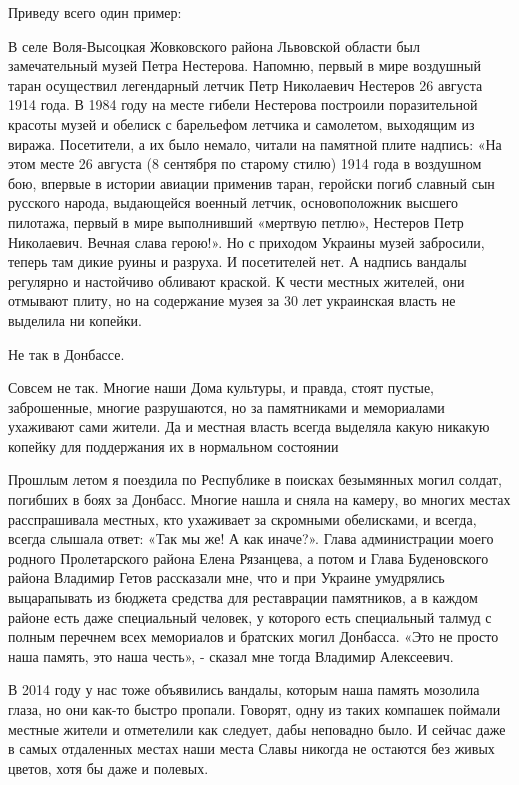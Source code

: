 Приведу всего один пример:

В селе Воля-Высоцкая Жовковского района Львовской области был замечательный
музей Петра Нестерова. Напомню, первый в мире воздушный таран осуществил
легендарный летчик Петр Николаевич Нестеров 26 августа 1914 года. В 1984 году
на месте гибели Нестерова построили поразительной красоты музей и обелиск с
барельефом летчика и самолетом, выходящим из виража. Посетители, а их было
немало, читали на памятной плите надпись: «На этом месте 26 августа (8 сентября
по старому стилю) 1914 года в воздушном бою, впервые в истории авиации применив
таран, геройски погиб славный сын русского народа, выдающейся военный летчик,
основоположник высшего пилотажа, первый в мире выполнивший «мертвую петлю»,
Нестеров Петр Николаевич. Вечная слава герою!». Но с приходом Украины музей
забросили, теперь там дикие руины и разруха. И посетителей нет. А надпись
вандалы регулярно и настойчиво обливают краской. К чести местных жителей, они
отмывают плиту, но на содержание музея за 30 лет украинская власть не выделила
ни копейки.


Не так в Донбассе.

Совсем не так. Многие наши Дома культуры, и правда, стоят пустые, заброшенные, многие разрушаются, но за памятниками и мемориалами ухаживают сами жители. Да и местная власть всегда выделяла какую никакую копейку для поддержания их в нормальном состоянии

Прошлым летом я поездила по Республике в поисках безымянных могил солдат, погибших в боях за Донбасс. Многие нашла и сняла на камеру, во многих местах расспрашивала местных, кто ухаживает за скромными обелисками, и всегда, всегда слышала ответ: «Так мы же! А как иначе?». Глава администрации моего родного Пролетарского района Елена Рязанцева, а потом и Глава Буденовского района Владимир Гетов рассказали мне, что и при Украине умудрялись выцарапывать из бюджета средства для реставрации памятников, а в каждом районе есть даже специальный человек, у которого есть специальный талмуд с полным перечнем всех мемориалов и братских могил Донбасса. «Это не просто наша память, это наша честь», - сказал мне тогда Владимир Алексеевич.

В 2014 году у нас тоже объявились вандалы, которым наша память мозолила глаза,
но они как-то быстро пропали. Говорят, одну из таких компашек поймали местные
жители и отметелили как следует, дабы неповадно было. И сейчас даже в самых
отдаленных местах наши места Славы никогда не остаются без живых цветов, хотя
бы даже и полевых.

